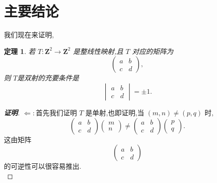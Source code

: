 \documentclass[twoside,11pt]{article}
\newtheorem{theorem}{定理}
\begin{document}
\section{主要结论}
\label{sec:2}
我们现在来证明,
\begin{theorem}
若 $T:\mathbf{Z}^2\to \mathbf{Z}^2$ 是整线性映射,且 $T$ 对应的矩阵为
$$
\begin{pmatrix}
  a&b\\
c&d
\end{pmatrix},
$$
则 $T$是双射的充要条件是
$$
\begin{vmatrix}
  a&b\\
c&d
\end{vmatrix}=\pm 1.
$$
\end{theorem}
\begin{proof}[\textbf{证明}]
$\Leftarrow:$首先我们证明 $T$ 是单射,也即证明,当 $(m,n)\neq (p,q)$ 时,
$$
\begin{pmatrix}
  a&b\\
c&d
\end{pmatrix}\begin{pmatrix}
  m\\
n
\end{pmatrix}\neq \begin{pmatrix}
  a&b\\
c&d
\end{pmatrix} \begin{pmatrix}
  p\\
q
\end{pmatrix}.
$$
这由矩阵
$$
\begin{pmatrix}
  a&b\\
c&d
\end{pmatrix}
$$
的可逆性可以很容易推出.\\


\end{proof}
\end{document}
